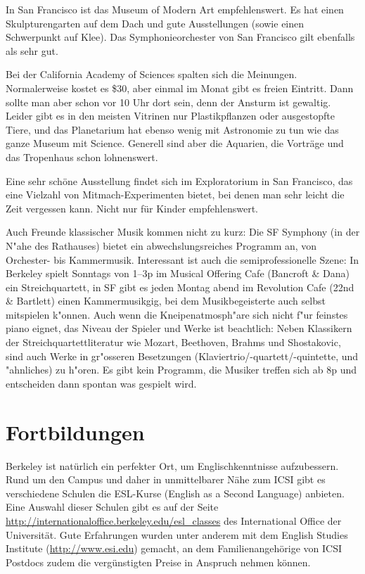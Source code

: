 \documentclass[a4paper]{scrreprt}
\begin{document}
In San Francisco ist das Museum of Modern Art empfehlenswert. Es hat einen Skulpturengarten auf dem Dach und gute Ausstellungen (sowie einen Schwerpunkt auf Klee). Das Symphonie\-orchester von San Francisco gilt ebenfalls als sehr gut.

Bei der California Academy of Sciences spalten sich die Meinungen. Normalerweise kostet es \$30, aber einmal im Monat gibt es freien Eintritt. Dann sollte man aber schon vor 10 Uhr dort sein, denn der Ansturm ist gewaltig. Leider gibt es in den meisten Vitrinen nur Plastikpflanzen oder ausgestopfte Tiere, und das Planetarium hat ebenso wenig mit Astronomie zu tun wie das ganze Museum mit Science. Generell sind aber die Aquarien, die Vorträge und das Tropenhaus schon lohnenswert.

Eine sehr schöne Ausstellung findet sich im Exploratorium in San Francisco, das eine Vielzahl von Mitmach-Experimenten bietet, bei denen man sehr leicht die Zeit vergessen kann. Nicht nur für Kinder empfehlenswert.

Auch Freunde klassischer Musik kommen nicht zu kurz: Die SF Symphony (in der N"ahe des Rathauses) bietet ein abwechslungsreiches Programm an, von Orchester- bis Kammermusik.
Interessant ist auch die semiprofessionelle Szene: In Berkeley spielt Sonntags von 1--3p im Musical Offering Cafe (Bancroft \& Dana) ein Streichquartett, in SF gibt es jeden Montag abend im Revolution Cafe (22nd \& Bartlett) einen Kammermusikgig, bei dem Musikbegeisterte auch selbst mitspielen k"onnen. Auch wenn die Kneipenatmosph"are sich nicht f"ur feinstes piano eignet, das Niveau der Spieler und Werke ist beachtlich: Neben Klassikern der Streichquartettliteratur wie Mozart, Beethoven, Brahms und Shostakovic, sind auch Werke in gr"osseren Besetzungen (Klaviertrio/-quartett/-quintette, und "ahnliches) zu h"oren. Es gibt kein Programm, die Musiker treffen sich ab 8p und entscheiden dann spontan was gespielt wird.
 
\section{Fortbildungen}

Berkeley ist natürlich ein perfekter Ort, um Englischkenntnisse
aufzubessern. Rund um den Campus und daher in unmittelbarer Nähe zum
ICSI gibt es verschiedene Schulen die ESL-Kurse (English as a Second
Language) anbieten. Eine Auswahl dieser Schulen gibt es auf der Seite
\url{http://internationaloffice.berkeley.edu/esl_classes} des International
Office der Universität. Gute Erfahrungen wurden unter anderem mit dem English Studies Institute (\url{http://www.esi.edu}) gemacht, an dem Familienangehörige von ICSI Postdocs zudem die vergünstigten Preise in Anspruch nehmen können.
\end{document}
